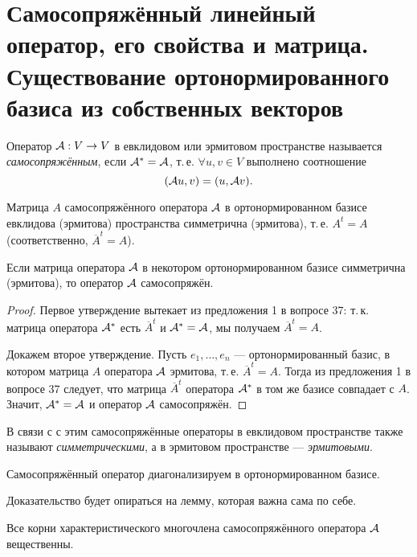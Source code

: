 \section{Самосопряжённый линейный оператор, его свойства и матрица. Существование ортонормированного базиса из собственных векторов}

\begin{definition}
    Оператор $\mathcal{A}: V \to V$ в евклидовом или эрмитовом пространстве называется \textit{самосопряжённым}, если $\mathcal{A}^\ast = \mathcal{A}$, т.\,е. $\forall u, v \in V$ выполнено соотношение
    \[
        (\mathcal{A} u, v) = (u, \mathcal{A} v).
    \]
\end{definition}

\begin{proposal}
    Матрица $A$ самосопряжённого оператора $\mathcal{A}$ в ортонормированном базисе евклидова (эрмитова) пространства симметрична (эрмитова), т.\,е. $A^t = A$ (соответственно, $\overline{A}^t = A$).

    Если матрица оператора $\mathcal{A}$ в некотором ортонормированном базисе симметрична (эрмитова), то оператор $\mathcal{A}$ самосопряжён.
\end{proposal}

\begin{proof}
    Первое утверждение вытекает из предложения 1 в вопросе 37: т.\,к. матрица оператора $\mathcal{A}^\ast$ есть $\overline{A}^t$ и $\mathcal{A}^\ast = \mathcal{A}$, мы получаем $\overline{A}^t = A$.

    Докажем второе утверждение. Пусть $e_1, \ldots, e_n$ --- ортонормированный базис, в котором матрица $A$ оператора $\mathcal{A}$ эрмитова, т.\,е. $\overline{A}^t = A$. Тогда из предложения 1 в вопросе 37 следует, что матрица $\overline{A}^t$ оператора $\mathcal{A}^\ast$ в том же базисе совпадает с $A$. Значит, $\mathcal{A}^\ast = \mathcal{A}$ и оператор $\mathcal{A}$ самосопряжён.
\end{proof}

В связи с с этим самосопряжённые операторы в евклидовом пространстве также называют \textit{симметрическими}, а в эрмитовом пространстве --- \textit{эрмитовыми}.

\begin{theorem}
    Самосопряжённый оператор диагонализируем в ортонормированном базисе.
\end{theorem}

Доказательство будет опираться на лемму, которая важна сама по себе.

\begin{lemma}
    Все корни характеристического многочлена самосопряжённого оператора $\mathcal{A}$ вещественны.
\end{lemma}

